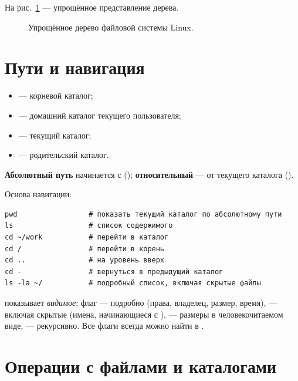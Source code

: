 На рис.\ \ref{fig:fs-tree} --- упрощённое представление дерева.

\begin{figure}[htb]
  \centering
  \caption{Упрощённое дерево файловой системы Linux.}
  \label{fig:fs-tree}
\end{figure}

\section{Пути и навигация}

\begin{itemize}
  \item \fpath{/} --- корневой каталог;
  \item \fpath{~} --- домашний каталог текущего
    пользователя;
  \item {} --- текущий каталог;
  \item {} --- родительский каталог.
\end{itemize}

\textbf{Абсолютный путь} начинается с \fpath{/}
(); \textbf{относительный} --- от текущего
каталога ().

Основа навигации:
\begin{verbatim}
pwd                 # показать текущий каталог по абсолютному пути
ls                  # список содержимого
cd ~/work           # перейти в каталог
cd /                # перейти в корень
cd ..               # на уровень вверх
cd -                # вернуться в предыдущий каталог
ls -la ~/           # подробный список, включая скрытые файлы
\end{verbatim}

 показывает \emph{видимое}; флаг  ---
подробно (права, владелец, размер, время),  --- включая
скрытые (имена, начинающиеся с ),  --- размеры
в человекочитаемом виде,  --- рекурсивно.
Все флаги всегда можно найти в .

\section{Операции с файлами и каталогами}

